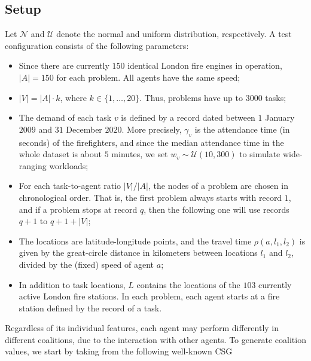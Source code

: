 \subsection{Setup}\label{sec:setup}

Let $\mathcal{N}$ and $\mathcal{U}$ denote the normal and uniform distribution,
respectively. A test configuration consists of the following parameters:
\begin{itemize}
    \item Since there are currently $150$ identical London fire engines in operation, $|A|
        = 150$ for each problem. All agents have the same speed;
    \item $|V| = |A| \cdot k$, where $k \in \{ 1, \dots, 20 \}$. Thus, problems have up to
        $3000$ tasks;
    \item The demand of each task $v$ is defined by a record dated between $1$ January
        $2009$ and $31$ December $2020$. More precisely, $\gamma_v$ is the attendance time
        (in seconds) of the firefighters, and since the median attendance time in the
        whole dataset is about $5$ minutes, we set $w_v \sim \mathcal{U}(10, 300)$ to
        simulate wide-ranging workloads;
    \item For each task-to-agent ratio $|V|/|A|$, the nodes of a problem are chosen in
        chronological order. That is, the first problem always starts with record $1$, and
        if a problem stops at record $q$, then the following one will use records $q + 1$
        to $q + 1 + |V|$;
    \item The locations are latitude-longitude points, and the travel time $\rho(a, l_1,
        l_2)$ is given by the great-circle distance in kilometers between locations $l_1$
        and $l_2$, divided by the (fixed) speed of agent $a$;
    \item In addition to task locations, $L$ contains the locations of the $103$ currently
        active London fire stations. In each problem, each agent starts at a fire station
        defined by the record of a task.
\end{itemize}
Regardless of its individual features, each agent may perform differently in different
coalitions, due to the interaction with other agents. To generate coalition values, we
start by taking from \cite[Section $4$]{rahwan2012} the following well-known CSG
